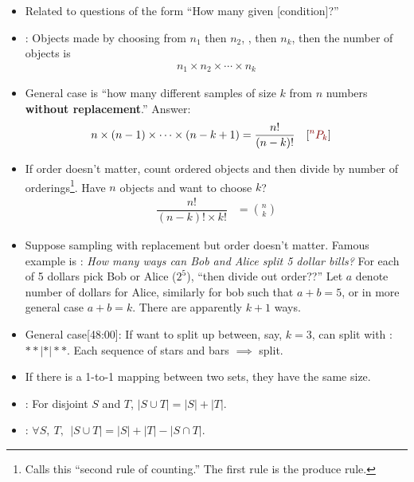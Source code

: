 \documentclass[12pt]{article}
\begin{document}
\begin{itemize}
	\item Related to questions of the form ``How many \textellipsis given [condition]?'' 
	\item {}: Objects made by choosing from $n_1$ then $n_2$, \textellipsis, then $n_k$, then the number of objects is
	\begin{align}
		n_1 \times n_2 \times \cdots \times n_k
	\end{align}
	\item {} General case is ``how many different samples of size $k$ from $n$ numbers \textbf{without replacement}.'' Answer:
	\begin{align}
		n \times (n-1) \times \cdots \times (n - k + 1) &= \dfrac{n!}{(n-k)!} \quad \text{[\red{$^nP_k$}]} 
	\end{align}
	\item If order doesn't matter, count ordered objects and then divide by number of orderings\footnote{Calls this ``second rule of counting.'' The first rule is the produce rule.}. Have $n$ objects and want to choose $k$? 
	\begin{align}
		\dfrac{n!}{(n-k)!\times k!} 	&= {n \choose k}
	\end{align}
	
	\item Suppose sampling with replacement but order doesn't matter. Famous example is : \textit{How many ways can Bob  and Alice split 5 dollar bills?} For each of 5 dollars pick Bob or Alice ($2^5$), ``then divide out order??'' Let $a$ denote number of dollars for Alice, similarly for bob such that $a + b = 5$, or in more general case $a + b = k$. There are apparently $k + 1$ ways.
	\item General case[48:00]: If want to split up between, say, $k = 3$, can split with : $**| * | **$. Each sequence of stars and bars $\implies$ split. 
	
	\item {} If there is a 1-to-1 mapping between two sets, they have the same size. 
	
	\item {}: For disjoint $S$ and $T$, $|S \cup T| = |S| + |T|$. 
	\item {}: $\forall S,~T,~~ |S \cup T| = |S| + |T| - |S \cap T|$. 
\end{itemize}
\vspace{\baselineskip}
\end{document}
